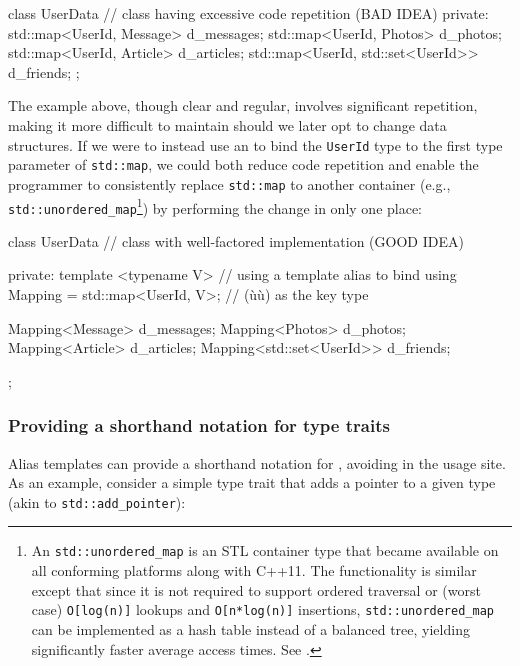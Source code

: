 \begin{emcppslisting}[language=C++]
class UserData  // class having excessive code repetition (BAD IDEA)
{
private:
    std::map<UserId, Message>          d_messages;
    std::map<UserId, Photos>           d_photos;
    std::map<UserId, Article>          d_articles;
    std::map<UserId, std::set<UserId>> d_friends;
};
\end{emcppslisting}
    
\noindent The example above, though clear and regular, involves significant
repetition, making it more difficult to maintain should we later opt to
change data structures. If we were to instead use an  to bind the \lstinline!UserId! type to the first type
parameter of \lstinline!std::map!, we could both reduce code repetition
and enable the programmer to consistently replace \lstinline!std::map!
to another container
(e.g., \lstinline!std::unordered_map!{\cprotect\footnote{An
\lstinline!std::unordered_map! is an STL container type that became
available on all conforming platforms along with C++11. The
functionality is similar except that since it is not required to
support ordered traversal or (worst case) \lstinline!O[log(n)]! lookups
and \lstinline!O[n*log(n)]! insertions, \lstinline!std::unordered_map! can
be implemented as a hash table instead of a balanced tree, yielding
significantly faster average access times. See
  \cite{cpprefb}.}}) by performing the change in only
one place:

\begin{emcppslisting}[language=C++]
class UserData  // class with well-factored implementation (GOOD IDEA)
{
private:
    template <typename V>                  // using a template alias to bind
    using Mapping = std::map<UserId, V>;   // (ù{}ù) as the key type

    Mapping<Message>          d_messages;
    Mapping<Photos>           d_photos;
    Mapping<Article>          d_articles;
    Mapping<std::set<UserId>> d_friends;
};
\end{emcppslisting}
    

\subsubsection[Providing a shorthand notation for type traits]{Providing a shorthand notation for type traits}\label{providing-a-shorthand-notation-for-type-traits}

Alias templates can provide a shorthand notation for , avoiding  in the usage site. As an
example, consider a simple type trait that adds a pointer to a given
type (akin to \lstinline!std::add_pointer!):

